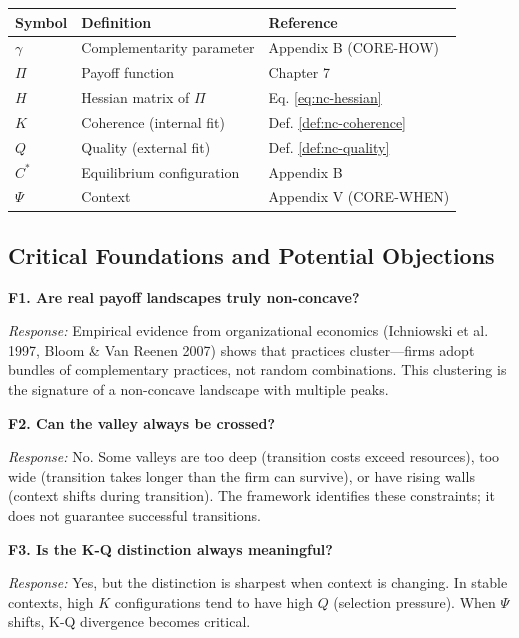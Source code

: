 \begin{center}
\renewcommand{\arraystretch}{1.3}
\begin{tabular}{lll}
\hline
\textbf{Symbol} & \textbf{Definition} & \textbf{Reference} \\
\hline
$\gamma$ & Complementarity parameter & Appendix B (CORE-HOW) \\
$\Pi$ & Payoff function & Chapter 7 \\
$H$ & Hessian matrix of $\Pi$ & Eq. \ref{eq:nc-hessian} \\
$K$ & Coherence (internal fit) & Def. \ref{def:nc-coherence} \\
$Q$ & Quality (external fit) & Def. \ref{def:nc-quality} \\
$C^*$ & Equilibrium configuration & Appendix B \\
$\Psi$ & Context & Appendix V (CORE-WHEN) \\
\hline
\end{tabular}
\end{center}


\subsection{Critical Foundations and Potential Objections}

\textbf{F1. Are real payoff landscapes truly non-concave?}

\textit{Response:} Empirical evidence from organizational economics (Ichniowski et al. 1997, Bloom \& Van Reenen 2007) shows that practices cluster---firms adopt bundles of complementary practices, not random combinations. This clustering is the signature of a non-concave landscape with multiple peaks.

\textbf{F2. Can the valley always be crossed?}

\textit{Response:} No. Some valleys are too deep (transition costs exceed resources), too wide (transition takes longer than the firm can survive), or have rising walls (context shifts during transition). The framework identifies these constraints; it does not guarantee successful transitions.

\textbf{F3. Is the K-Q distinction always meaningful?}

\textit{Response:} Yes, but the distinction is sharpest when context is changing. In stable contexts, high $K$ configurations tend to have high $Q$ (selection pressure). When $\Psi$ shifts, K-Q divergence becomes critical.


